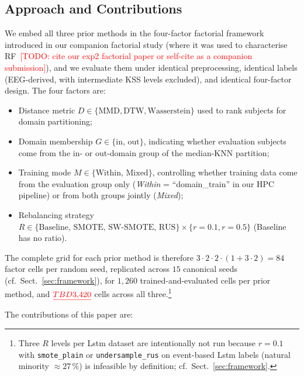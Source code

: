 \documentclass[lettersize,journal]{IEEEtran}
\newcommand{\todo}[1]{\textcolor{red}{[TODO: #1]}}
\newcommand{\Impl}[1]{\textsc{#1}}
\newcommand{\TBD}[1]{\textcolor{red}{\underline{TBD#1}}}
\begin{document}
\subsection{Approach and Contributions}
We embed all three prior methods in the four-factor factorial framework introduced in our companion factorial study (where it was used to characterise \Impl{RF}~\cite{nakagama2025factorial}\todo{cite our exp2 factorial paper or self-cite as a companion submission}), and we evaluate them under identical preprocessing, identical labels (EEG-derived, with intermediate KSS levels excluded), and identical four-factor design.
The four factors are:
\begin{itemize}
\item Distance metric $D \in \{\mathrm{MMD}, \mathrm{DTW}, \mathrm{Wasserstein}\}$ used to rank subjects for domain partitioning;
\item Domain membership $G \in \{\mathrm{in},\,\mathrm{out}\}$, indicating whether evaluation subjects come from the in- or out-domain group of the median-KNN partition;
\item Training mode $M \in \{\mathrm{Within},\,\mathrm{Mixed}\}$, controlling whether training data come from the evaluation group only (\textit{Within} = ``domain\_train'' in our HPC pipeline) or from both groups jointly (\textit{Mixed});
\item Rebalancing strategy $R \in \{\text{Baseline},\,\text{SMOTE},\,\text{SW-SMOTE},\,\text{RUS}\} \times \{r{=}0.1, r{=}0.5\}$ (Baseline has no ratio).
\end{itemize}
The complete grid for each prior method is therefore $3 \cdot 2 \cdot 2 \cdot (1 + 3 \cdot 2) = 84$ factor cells per random seed, replicated across $15$ canonical seeds (cf.\ Sect.~\ref{sec:framework}), for $1{,}260$ trained-and-evaluated cells per prior method, and $\TBD{3{,}420}$ cells across all three.\footnote{Three $R$ levels per Lstm dataset are intentionally not run because $r{=}0.1$ with \texttt{smote\_plain} or \texttt{undersample\_rus} on event-based Lstm labels (natural minority $\approx 27\,\%$) is infeasible by definition; cf.\ Sect.~\ref{sec:framework}.}

The contributions of this paper are:
\end{document}

